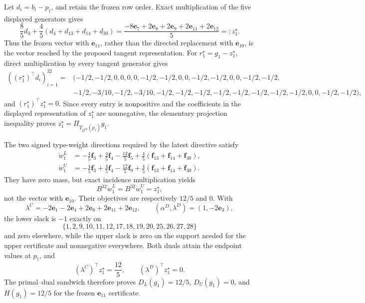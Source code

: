 Let \(d_i=b_i-p_\dagger\), and retain the frozen row order.  Exact multiplication of the five displayed generators gives
\[
\frac85d_3+\frac45(d_4+d_{13}+d_{14}+d_{30})
=\frac{-8\mathbf e_7+2\mathbf e_8+2\mathbf e_9+2\mathbf e_{11}+2\mathbf e_{12}}5
=:z_1^\star.
\]
Thus the frozen vector with \(\mathbf e_{11}\), rather than the directed replacement with \(\mathbf e_{10}\), is the vector reached by the proposed tangent representation.  For \(r_1^\star=g_1-z_1^\star\), direct multiplication by every tangent generator gives
\[
\begin{split}
((r_1^\star)^\top d_i)_{i=1}^{32}={}&(-1/2,-1/2,0,0,0,0,-1/2,-1/2,
0,0,-1/2,-1/2,0,0,-1/2,-1/2,\\
&-1/2,-3/10,-1/2,-3/10,-1/2,-1/2,-1/2,-1/2,
-1/2,-1/2,-1/2,-1/2,0,0,-1/2,-1/2),
\end{split}
\]
and \((r_1^\star)^\top z_1^\star=0\).  Since every entry is nonpositive and the coefficients in the displayed representation of \(z_1^\star\) are nonnegative, the elementary projection inequality proves \(z_1^\star=\Pi_{T_{\mathfrak O^{32}}(p_\dagger)}g_1\).

The two signed type-weight directions required by the latest directive satisfy
\[
\begin{split}
\dot w_1^L&=-\frac45\mathbf f_3+\frac45\mathbf f_4-\frac{12}{5}\mathbf f_5
+\frac45(\mathbf f_{13}+\mathbf f_{14}+\mathbf f_{30}),\\
\dot w_1^U&=-\frac45\mathbf f_3+\frac45\mathbf f_4-\frac{12}{5}\mathbf f_9
+\frac45(\mathbf f_{13}+\mathbf f_{14}+\mathbf f_{30}).
\end{split}
\]
They have zero mass, but exact incidence multiplication yields
\[
B^{32}\dot w_1^L=B^{32}\dot w_1^U=z_1^\star,
\]
not the vector with \(\mathbf e_{10}\).  Their objectives are respectively \(12/5\) and \(0\).  With
\[
\lambda^C=-2\mathbf e_1-2\mathbf e_4+2\mathbf e_8+2\mathbf e_{11}+2\mathbf e_{12},
\qquad
(\alpha^D,\lambda^D)=(1,-2\mathbf e_3),
\]
the lower slack is \(-1\) exactly on
\[
\{1,2,9,10,11,12,17,18,19,20,25,26,27,28\}
\]
and zero elsewhere, while the upper slack is zero on the support needed for the upper certificate and nonnegative everywhere.  Both duals attain the endpoint values at \(p_\dagger\), and
\[
(\lambda^C)^\top z_1^\star=\frac{12}{5},
\qquad
(\lambda^D)^\top z_1^\star=0.
\]
The primal--dual sandwich therefore proves \(D_L(g_1)=12/5\), \(D_U(g_1)=0\), and \(H(g_1)=12/5\) for the frozen \(\mathbf e_{11}\) certificate.

